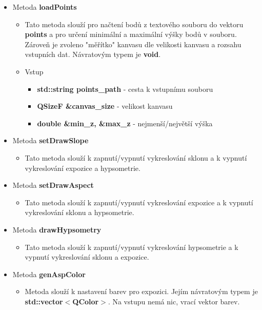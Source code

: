 \documentclass[a4paper, 12pt]{article}
\begin{document}
\begin{itemize}
\begin{itemize}
	\item Metoda \textbf{loadPoints}
\begin{itemize}
	\item Tato metoda slouží pro načtení bodů z textového souboru do vektoru \textbf{points} a pro určení minimální a maximální výšky bodů v souboru. Zároveň je zvoleno "měřítko" kanvasu dle velikosti kanvasu a rozsahu vstupních dat. Návratovým typem je \textbf{void}.
	\item Vstup
	\begin{itemize}
		\item \textbf{std::string points\_path} - cesta k vstupnímu souboru
		\item \textbf{QSizeF \&canvas\_size} - velikost kanvasu
		\item \textbf{double \&min\_z, \&max\_z} - nejmenší/největší výška
	\end{itemize}
\end{itemize}
	\item Metoda \textbf{setDrawSlope}
	\begin{itemize}
		\item Tato metoda slouží k zapnutí/vypnutí vykreslování sklonu a k vypnutí vykreslování expozice a hypsometrie. 
	\end{itemize}
%
%
	\item Metoda \textbf{setDrawAspect}
	\begin{itemize}
		\item Tato metoda slouží k zapnutí/vypnutí vykreslování expozice a k vypnutí vykreslování sklonu a hypsometrie. 
	\end{itemize}

\item Metoda \textbf{drawHypsometry}
\begin{itemize}
		\item Tato metoda slouží k zapnutí/vypnutí vykreslování hypsometrie a k vypnutí vykreslování sklonu a expozice. 
	\end{itemize}
	
	\item Metoda \textbf{genAspColor}
	\begin{itemize}
	\item Metoda slouží k nastavení barev pro expozici. Jejím návratovým typem je \textbf{std::vector$<$QColor$>$}. Na vstupu nemá nic, vrací vektor barev.
	\end{itemize}

%	


\end{itemize}
\end{itemize}
\end{document}
